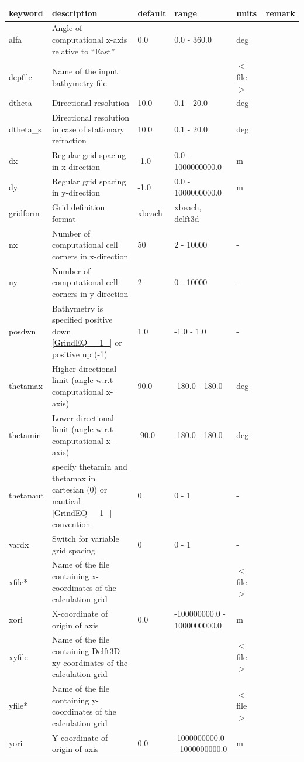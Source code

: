 \documentclass{article}
\begin{document}
\begin{tabular}{|p{0.6in}|p{1.0in}|p{0.5in}|p{1.0in}|p{0.5in}|p{0.5in}|} \hline 
keyword & description\textbf{} & default & range & units & remark \\ \hline 
alfa & Angle of computational x-axis relative to ``East'' & 0.0 & 0.0 - 360.0 & deg &  \\ \hline 
depfile & Name of the input bathymetry file &  &  & $<$file$>$ &  \\ \hline 
dtheta & Directional resolution & 10.0 & 0.1 - 20.0 & deg &  \\ \hline 
dtheta\_s & Directional resolution in case of stationary refraction  & 10.0 & 0.1 - 20.0 & deg &  \\ \hline 
dx & Regular grid spacing in x-direction & -1.0 & 0.0 - 1000000000.0 & m &  \\ \hline 
dy & Regular grid spacing in y-direction & -1.0 & 0.0 - 1000000000.0 & m &  \\ \hline 
gridform & Grid definition format & xbeach & xbeach, delft3d &  &  \\ \hline 
nx & Number of computational cell corners in x-direction & 50 & 2 - 10000 & - &  \\ \hline 
ny & Number of computational cell corners in y-direction & 2 & 0 - 10000 & - &  \\ \hline 
posdwn & Bathymetry is specified positive down \eqref{GrindEQ__1_} or positive up (-1) & 1.0 & -1.0 - 1.0 & - &  \\ \hline 
thetamax & Higher directional limit (angle w.r.t computational x-axis) & 90.0 & -180.0 - 180.0 & deg &  \\ \hline 
thetamin & Lower directional limit (angle w.r.t computational x-axis) & -90.0 & -180.0 - 180.0 & deg &  \\ \hline 
thetanaut & specify thetamin and thetamax in cartesian (0) or nautical \eqref{GrindEQ__1_} convention  & 0 & 0 - 1 & - &  \\ \hline 
vardx & Switch for variable grid spacing & 0 & 0 - 1 & - &  \\ \hline 
xfile* & Name of the file containing x-coordinates of the calculation grid &  &  & $<$file$>$ &  \\ \hline 
xori & X-coordinate of origin of axis & 0.0 & -100000000.0 - 1000000000.0 & m &  \\ \hline 
xyfile & Name of the file containing Delft3D xy-coordinates of the calculation grid &  &  & $<$file$>$ &  \\ \hline 
yfile* & Name of the file containing y-coordinates of the calculation grid &  &  & $<$file$>$ &  \\ \hline 
yori & Y-coordinate of origin of axis & 0.0 & -1000000000.0 - 1000000000.0 & m &  \\ \hline 
\end{tabular}
\end{document}
